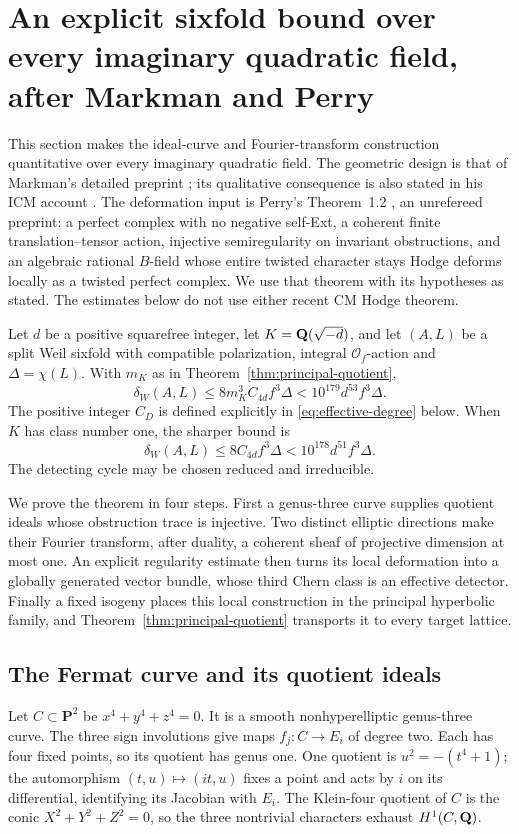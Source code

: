 \section{An explicit sixfold bound over every imaginary quadratic field, after Markman and Perry}
\label{sec:effective-sixfolds}
This section makes the ideal-curve and Fourier-transform construction quantitative over every imaginary quadratic field. The geometric design is that of Markman's detailed preprint \cite[\S\S8--9]{MarkmanSecant}; its qualitative consequence is also stated in his ICM account \cite[Theorem~1.2]{MarkmanICM}. The deformation input is Perry's Theorem~1.2 \cite{Perry}, an unrefereed preprint: a perfect complex with no negative self-Ext, a coherent finite translation--tensor action, injective semiregularity on invariant obstructions, and an algebraic rational $B$-field whose entire twisted character stays Hodge deforms locally as a twisted perfect complex. We use that theorem with its hypotheses as stated. The estimates below do not use either recent CM Hodge theorem.

\begin{theorem}\label{thm:all-field-sixfolds}
Let $d$ be a positive squarefree integer, let $K=\mathbf Q(\sqrt{-d})$, and let $(A,L)$ be a split Weil sixfold with compatible polarization, integral $\mathcal O_f$-action and $\Delta=\chi(L)$. With $m_K$ as in Theorem~\ref{thm:principal-quotient},
\[
 \delta_W(A,L)\le8m_K^3 C_{4d} f^3\Delta
             <10^{179}d^{53}f^3\Delta.
\]
The positive integer $C_D$ is defined explicitly in \eqref{eq:effective-degree} below. When $K$ has class number one, the sharper bound is
\[
 \delta_W(A,L)\le8C_{4d}f^3\Delta
                  <10^{178}d^{51}f^3\Delta.
\]
The detecting cycle may be chosen reduced and irreducible.
\end{theorem}

We prove the theorem in four steps. First a genus-three curve supplies quotient ideals whose obstruction trace is injective. Two distinct elliptic directions make their Fourier transform, after duality, a coherent sheaf of projective dimension at most one. An explicit regularity estimate then turns its local deformation into a globally generated vector bundle, whose third Chern class is an effective detector. Finally a fixed isogeny places this local construction in the principal hyperbolic family, and Theorem~\ref{thm:principal-quotient} transports it to every target lattice.

\subsection{The Fermat curve and its quotient ideals}
Let $C\subset\mathbf P^2$ be $x^4+y^4+z^4=0$. It is a smooth nonhyperelliptic genus-three curve. The three sign involutions give maps $f_j:C\to E_i$ of degree two. Each has four fixed points, so its quotient has genus one. One quotient is $u^2=-(t^4+1)$; the automorphism $(t,u)\mapsto(it,u)$ fixes a point and acts by $i$ on its differential, identifying its Jacobian with $E_i$. The Klein-four quotient of $C$ is the conic $X^2+Y^2+Z^2=0$, so the three nontrivial characters exhaust $H^1(C,\mathbf Q)$.

